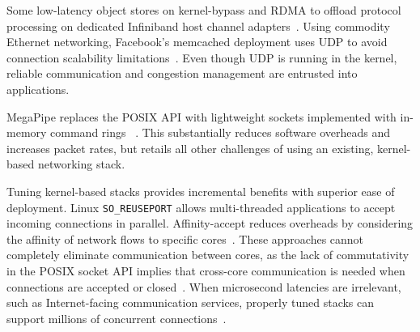  Some low-latency object stores on
kernel-bypass and RDMA to offload protocol processing on dedicated
Infiniband host channel
adapters~\cite{DBLP:conf/sosp/OngaroRSOR11,Jose:2011:MDH,mitchell:rdma,dragojevic14farm}.
Using commodity Ethernet networking, Facebook's memcached deployment
uses UDP to avoid connection scalability
limitations~\cite{nishtala2013scaling}. Even though UDP is running in
the kernel, reliable communication and congestion management are
entrusted into applications.

 MegaPipe replaces the POSIX
API with lightweight sockets implemented with in-memory command
rings~\cite{han2012megapipe} . This substantially reduces software
overheads and increases packet rates, but retails all other challenges
of using an existing, kernel-based networking stack.

 Tuning kernel-based stacks provides
incremental benefits with superior ease of deployment.  Linux
\texttt{SO\_REUSEPORT} allows multi-threaded applications to accept
incoming connections in parallel. Affinity-accept reduces overheads by
considering the affinity of network flows to specific
cores~\cite{DBLP:conf/eurosys/PesterevSZM12}. These approaches cannot
completely eliminate communication between cores, as the lack of
commutativity in the POSIX socket API implies that cross-core
communication is needed when connections are accepted or
closed~\cite{DBLP:conf/sosp/ClementsKZMK13}. When microsecond
latencies are irrelevant, such as Internet-facing communication
services, properly tuned stacks can support millions of concurrent
connections~\cite{whatsapp-2mil}.
